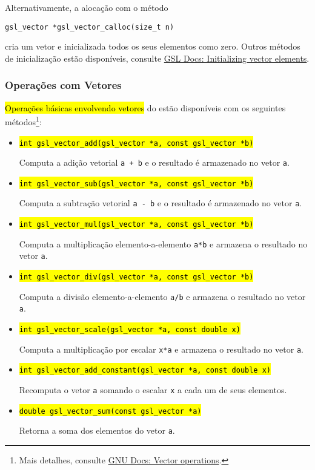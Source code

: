 \documentclass[12pt]{article}
\begin{document}
\begin{obs}
  Alternativamente, a alocação com o método
\begin{lstlisting}
gsl_vector *gsl_vector_calloc(size_t n)
\end{lstlisting}
  cria um vetor e inicializada todos os seus elementos como zero. Outros métodos de inicialização estão disponíveis, consulte \href{https://www.gnu.org/software/gsl/doc/html/vectors.html#initializing-vector-elements}{GSL Docs: Initializing vector elements}.
\end{obs}

\subsubsection{Operações com Vetores}

\hl{Operações básicas envolvendo vetores} do {\gsl} estão disponíveis com os seguintes métodos\footnote{Mais detalhes, consulte \href{https://www.gnu.org/software/gsl/doc/html/vectors.html\#vector-operations}{GNU Docs: Vector operations}.}:
\begin{itemize}
\item \hl{\texttt{int gsl\_vector\_add(gsl\_vector *a, const gsl\_vector *b)}}

  Computa a adição vetorial \lstinline!a + b! e o resultado é armazenado no vetor \lstinline+a+.

\item \hl{\texttt{int gsl\_vector\_sub(gsl\_vector *a, const gsl\_vector *b)}}

  Computa a subtração vetorial \lstinline!a - b! e o resultado é armazenado no vetor \lstinline!a!.

\item \hl{\texttt{int gsl\_vector\_mul(gsl\_vector *a, const gsl\_vector *b)}}

  Computa a multiplicação elemento-a-elemento \lstinline!a*b! e armazena o resultado no vetor \lstinline!a!.

\item \hl{\texttt{int gsl\_vector\_div(gsl\_vector *a, const gsl\_vector *b)}}

  Computa a divisão elemento-a-elemento \lstinline!a/b! e armazena o resultado no vetor \lstinline!a!.

\item \hl{\texttt{int gsl\_vector\_scale(gsl\_vector *a, const double x)}}

  Computa a multiplicação por escalar \lstinline!x*a! e armazena o resultado no vetor \lstinline!a!.

\item \hl{\texttt{int gsl\_vector\_add\_constant(gsl\_vector *a, const double x)}}

  Recomputa o vetor \lstinline!a! somando o escalar \lstinline!x! a cada um de seus elementos.

\item \hl{\texttt{double gsl\_vector\_sum(const gsl\_vector *a)}}

  Retorna a soma dos elementos do vetor \lstinline!a!.
\end{itemize}
\end{document}
